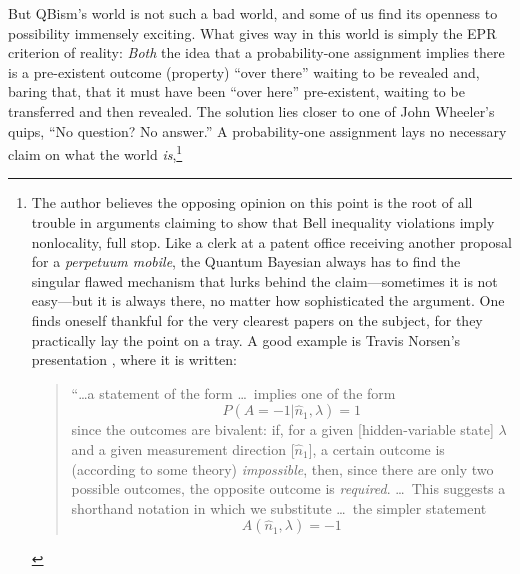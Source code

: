 But QBism's world is not such a bad world, and some of us find its openness to possibility immensely exciting.  What gives way in this world is simply the EPR criterion of reality:  {\it Both\/} the idea that a probability-one assignment implies there is a pre-existent outcome (property) ``over there'' waiting to be revealed and, baring that, that it must have been ``over here'' pre-existent, waiting to be transferred and then revealed.  The solution lies closer to one of John Wheeler's quips, ``No question? No answer.''  A probability-one assignment lays no necessary claim on what the world {\it is},\footnote{The author believes the opposing opinion on this point is the root of all trouble in arguments claiming to show that Bell inequality violations imply nonlocality, full stop.  Like a clerk at a patent office receiving another proposal for a {\it perpetuum mobile}, the Quantum Bayesian always has to find the singular flawed mechanism that lurks behind the claim---sometimes it is not easy---but it is always there, no matter how sophisticated the argument. One finds oneself thankful for the very clearest papers on the subject, for they practically lay the point on a tray.  A good example is Travis Norsen's presentation \cite{Norsen06}, where it is written:%
\begin{quotation}\footnotesize
``\ldots a statement of the form \ldots\ implies one of the form
$$
P(A = -1|\hat{n}_1, \lambda) = 1
$$
since the outcomes are bivalent: if, for a given [hidden-variable state] $\lambda$ and a given measurement direction [$\hat{n}_1$], a certain outcome is (according to some theory) {\it impossible}, then, since there are only two possible outcomes, the opposite outcome is {\it required}. \ldots\ This suggests a shorthand notation in which we substitute \ldots\ the simpler statement
$$
A(\hat{n}_1, \lambda) = -1
$$


\end{quotation}}
